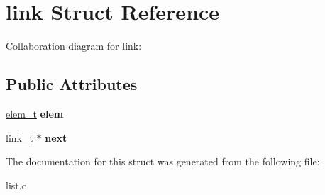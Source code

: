 \hypertarget{structlink}{}\section{link Struct Reference}
\label{structlink}


Collaboration diagram for link\+:
\subsection*{Public Attributes}
\begin{DoxyCompactItemize}
\item 
\hyperlink{unionelement}{elem\+\_\+t} {\bfseries elem}\hypertarget{structlink_a83c7f47df8ba3635bf45c0b8debffde5}{}\label{structlink_a83c7f47df8ba3635bf45c0b8debffde5}

\item 
\hyperlink{structlink}{link\+\_\+t} $\ast$ {\bfseries next}\hypertarget{structlink_a5e51af3becfae77d89502036a8e508c2}{}\label{structlink_a5e51af3becfae77d89502036a8e508c2}

\end{DoxyCompactItemize}


The documentation for this struct was generated from the following file\+:\begin{DoxyCompactItemize}
\item 
list.\+c\end{DoxyCompactItemize}
